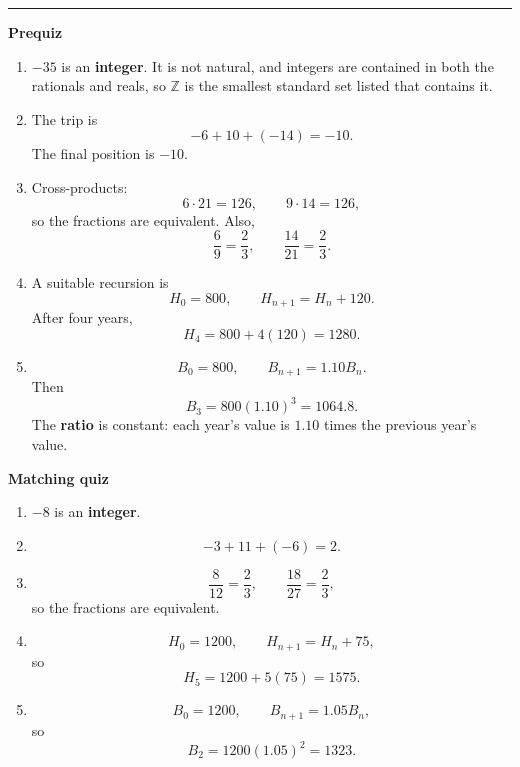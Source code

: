 \documentclass[10pt]{article}
\newcommand{\modulekey}[2]{\clearpage{\Large\bfseries\textcolor{olive}{Module #1: #2 — Answer Key}}\par\textcolor{gold}{\rule{\linewidth}{1.2pt}}\par}
\begin{document}
\modulekey{1}{Number Systems}
\textbf{Prequiz}
\begin{enumerate}
\item \(-35\) is an \textbf{integer}. It is not natural, and integers are contained in both the rationals and reals, so \(\mathbb Z\) is the smallest standard set listed that contains it.
\item The trip is
\[
-6+10+(-14)=-10.
\]
The final position is \(\boxed{-10}\).
\item Cross-products:
\[
6\cdot21=126,\qquad 9\cdot14=126,
\]
so the fractions are equivalent. Also,
\[
\frac69=\frac23,\qquad \frac{14}{21}=\frac23.
\]
\item A suitable recursion is
\[
H_0=800,\qquad H_{n+1}=H_n+120.
\]
After four years,
\[
H_4=800+4(120)=\boxed{1280}.
\]
\item
\[
B_0=800,\qquad B_{n+1}=1.10B_n.
\]
Then
\[
B_3=800(1.10)^3=\boxed{1064.8}.
\]
The \textbf{ratio} is constant: each year's value is \(1.10\) times the previous year's value.
\end{enumerate}

\textbf{Matching quiz}
\begin{enumerate}
\item \(-8\) is an \textbf{integer}.
\item
\[
-3+11+(-6)=\boxed{2}.
\]
\item
\[
\frac8{12}=\frac23,\qquad \frac{18}{27}=\frac23,
\]
so the fractions are equivalent.
\item
\[
H_0=1200,\qquad H_{n+1}=H_n+75,
\]
so
\[
H_5=1200+5(75)=\boxed{1575}.
\]
\item
\[
B_0=1200,\qquad B_{n+1}=1.05B_n,
\]
so
\[
B_2=1200(1.05)^2=\boxed{1323}.
\]
\end{enumerate}
\end{document}
